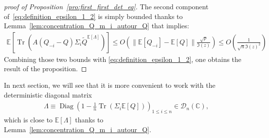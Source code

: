 \documentclass[ECP, preprint]{ejpecp} %
\DeclareMathOperator{\tr}{Tr}
\DeclareMathOperator{\diag}{Diag}
\DeclareMathOperator{\hs}{HS}
\begin{document}
\begin{proof}[proof of Proposition~\ref{pro:first_first_det_eq}]
    The second component of~\eqref{eq:definition_epsilon_1_2} is simply bounded thanks to Lemma~\ref{lem:concentration_Q_m_i_autour_Q} that implies:
    \begin{align*}
        \mathbb{E}\left[\tr \left( A(Q_{-i} - Q) \Sigma_i \tilde Q^{\mathbb E[\Lambda]} \right)\right]
        \leq O \left(  \|\mathbb E[Q_{-i}]- \mathbb E[Q] \| \frac{\sqrt{p}}{\Im(z)} \right)
        \leq O \left( \frac{1}{\sqrt n\Im(z)^ 2} \right) 
    \end{align*}
    Combining those two bounds with \eqref{eq:definition_epsilon_1_2}, one obtains the result of the proposition.
\end{proof}







In next section, we will see that it is more convenient to work with the deterministic diagonal matrix
\begin{align*}
     \hat \Lambda \equiv
 \diag \left( 1 - \frac{1}{n} \tr(\Sigma_i\mathbb E[Q]) \right)_{1\leq i \leq n} \in \mathcal D_n(\mathbb C),
 \end{align*} 
 which is close to $\mathbb E[\Lambda]$ thanks to Lemma~\ref{lem:concentration_Q_m_i_autour_Q}.
\end{document}
